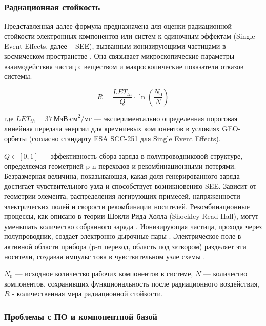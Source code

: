 \subsubsection{Радиационная стойкость}

Представленная далее формула предназначена для оценки радиационной стойкости электронных компонентов или систем к одиночным эффектам (Single Event Effects, далее -- SEE), вызванным ионизирующими частицами в космическом пространстве \cite{ESASCC25100, MILSTD883, ECSS_Q_ST_60_15C}. Она связывает микроскопические параметры взаимодействия частиц с веществом и макроскопические показатели отказов системы.

\begin{equation}
	R = \frac{LET_{th}}{Q} \cdot \ln\left(\frac{N_0}{N}\right)
\end{equation}

где $LET_{th} = 37\ \text{МэВ·см}^2/\text{мг}$ — экспериментально определенная пороговая линейная передача
энергии для кремниевых компонентов в
условиях GEO-орбиты (согласно стандарту ESA SCC-251 для Single Event Effects).

$Q \in [0,1]$ — эффективность сбора заряда в полупроводниковой структуре,
определяемая геометрией p-n переходов и рекомбинационными потерями. Безразмерная величина, показывающая, какая доля генерированного заряда достигает чувствительного узла и способствует возникновению SEE. Зависит от геометрии элемента, распределения легирующих примесей, напряженности электрических полей и скорости рекомбинации носителей. Рекомбинационные процессы, как описано в теории Шокли-Рида-Холла (Shockley-Read-Hall), могут уменьшать количество собранного заряда \cite{NASA_AnnealingKinetics}. Ионизирующая частица, проходя через полупроводник, создает электронно-дырочные пары \cite[Раздел III]{DTIC_GaAs_SchottkyRad}. Электрическое поле в активной области прибора (p-n переход, область под затвором) разделяет эти носители, создавая импульс тока в чувствительном узле схемы \cite[Раздел II]{DTIC_GaAs_SchottkyRad}.

$N_0$ —
исходное количество рабочих компонентов в системе, $N$ — количество компонентов,
сохранивших функциональность после радиационного воздействия, \textbf{$R$} - количественная мера радиационной стойкости.



\subsubsection{Проблемы с ПО и компонентной базой}


